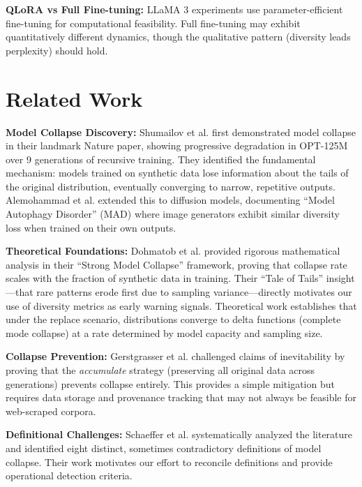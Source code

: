 \documentclass[conference]{IEEEtran}
\begin{document}
\textbf{QLoRA vs Full Fine-tuning:} LLaMA 3 experiments use parameter-efficient fine-tuning for computational feasibility. Full fine-tuning may exhibit quantitatively different dynamics, though the qualitative pattern (diversity leads perplexity) should hold.

\section{Related Work}

\textbf{Model Collapse Discovery:} Shumailov et al. \cite{shumailov2024nature} first demonstrated model collapse in their landmark Nature paper, showing progressive degradation in OPT-125M over 9 generations of recursive training. They identified the fundamental mechanism: models trained on synthetic data lose information about the tails of the original distribution, eventually converging to narrow, repetitive outputs. Alemohammad et al. \cite{alemohammad2024self} extended this to diffusion models, documenting ``Model Autophagy Disorder'' (MAD) where image generators exhibit similar diversity loss when trained on their own outputs.

\textbf{Theoretical Foundations:} Dohmatob et al. \cite{dohmatob2025strong} provided rigorous mathematical analysis in their ``Strong Model Collapse'' framework, proving that collapse rate scales with the fraction of synthetic data in training. Their ``Tale of Tails'' insight---that rare patterns erode first due to sampling variance---directly motivates our use of diversity metrics as early warning signals. Theoretical work establishes that under the replace scenario, distributions converge to delta functions (complete mode collapse) at a rate determined by model capacity and sampling size.

\textbf{Collapse Prevention:} Gerstgrasser et al. \cite{gerstgrasser2024inevitable} challenged claims of inevitability by proving that the \textit{accumulate} strategy (preserving all original data across generations) prevents collapse entirely. This provides a simple mitigation but requires data storage and provenance tracking that may not always be feasible for web-scraped corpora.

\textbf{Definitional Challenges:} Schaeffer et al. \cite{schaeffer2025position} systematically analyzed the literature and identified eight distinct, sometimes contradictory definitions of model collapse. Their work motivates our effort to reconcile definitions and provide operational detection criteria.
\end{document}
